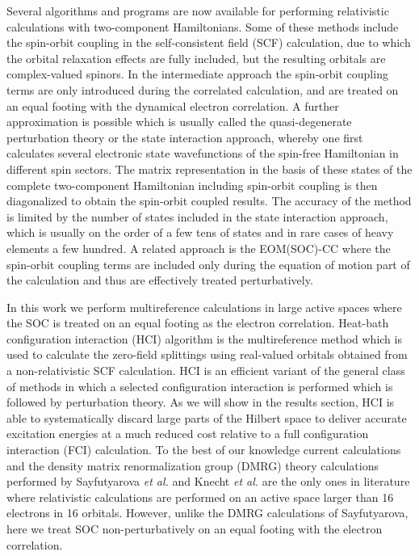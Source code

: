 \documentclass[10pt,aps,prb,twocolumn,amsmath,amssymb,superscriptaddress]{revtex4-1}
\begin{document}
Several algorithms and programs are now available for performing relativistic calculations with two-component Hamiltonians\cite{Buenker1998,BERNING2000,Vallet2000,Yanai2003,Gordon2005,Kleinschmidt2006,Gauss2009,Neese2012,Mai2014,MOLPRO_brief,Aquilante2016}. Some of these methods include the spin-orbit coupling in the self-consistent field (SCF) calculation, due to which the orbital relaxation effects are fully included, but the resulting orbitals are complex-valued spinors\cite{Esser1981,MyeongCheolKim1996,Fleig2001,Kim2014,Kim2012}. In the intermediate approach the spin-orbit coupling terms are only introduced during the correlated calculation\cite{Sjovoll1997,Yabushita1999,Fedorov2000,Kleinschmidt2006,Ganyushin2013}, and are treated on an equal footing with the dynamical electron correlation. A further approximation is possible which is usually called the quasi-degenerate perturbation theory or the state interaction approach, whereby one first calculates several electronic state wavefunctions of the spin-free Hamiltonian in different spin sectors.
The matrix representation in the basis of these states of the complete two-component Hamiltonian including spin-orbit coupling is then diagonalized to obtain the spin-orbit coupled results\cite{B401472N,Ganyushin2006,Roemelt2015,Sayfutyarova2016,Knecht2016}.
The accuracy of the method is limited by the number of states included in the state interaction approach, which is usually on the order of a few tens of states and in rare cases of heavy elements a few hundred\cite{Liu2016}. A related approach is the EOM(SOC)-CC\cite{Klein2008,Cao2017} where the spin-orbit coupling terms are included only during the equation of motion part of the calculation and thus are effectively treated perturbatively.

In this work we perform multireference calculations in large active spaces where the SOC is treated on an equal footing as the electron correlation. Heat-bath configuration interaction (HCI) algorithm\cite{HolTubUmr-JCTC-16,ShaHolUmr-JCTC-17} is the multireference method which is used to calculate the zero-field splittings using real-valued orbitals obtained from a non-relativistic SCF calculation. HCI is an efficient variant of the general class of methods in which a selected configuration
interaction is performed which is followed by perturbation theory. As we will show in the results section, HCI is able to systematically discard large parts of the Hilbert space to deliver accurate excitation energies at a much reduced cost relative to a full configuration interaction (FCI) calculation. To the best of our knowledge current calculations and the density matrix renormalization group (DMRG) theory calculations performed by Sayfutyarova \textit{et al.}\cite{Sayfutyarova2016} and
Knecht \textit{et al.}\cite{Knecht2014} are the only ones in literature where relativistic calculations are performed on an active space larger than 16 electrons in 16 orbitals. However, unlike the DMRG calculations of Sayfutyarova, here we treat SOC non-perturbatively on an equal footing with the electron correlation.
\end{document}
